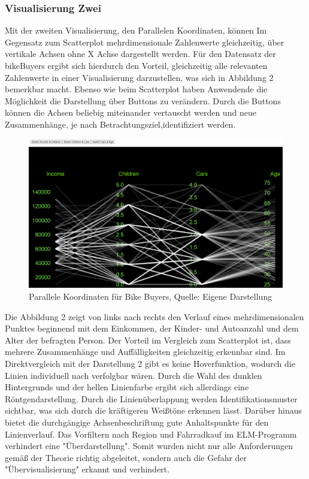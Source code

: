 \documentclass[usegeometry=true]{scrartcl}
\begin{document}
\subsubsection{Visualisierung Zwei}
Mit der zweiten Visualisierung, den Parallelen Koordinaten, können Im Gegensatz zum Scatterplot mehrdimensionale Zahlenwerte gleichzeitig, über vertikale Achsen ohne X Achse dargestellt werden.
Für den Datensatz der bikeBuyers ergibt sich hierdurch den Vorteil, gleichzeitig alle relevanten Zahlenwerte in einer Visualisierung darzustellen, was sich in Abbildung 2 bemerkbar macht. Ebenso wie beim Scatterplot haben Anwendende die Möglichkeit die Darstellung über Buttons zu verändern. Durch die Buttons können die Achsen beliebig miteinander vertauscht werden und neue Zusammenhänge, je nach Betrachtungsziel,identifiziert werden. 
\begin{figure}[h]
\begin{center}
\includegraphics[width=16cm]{Bilder/ParallelCoordsV2.png}
\caption{Parallele Koordinaten für Bike Buyers, Quelle: Eigene Darstellung}
\end{center}
\end{figure}
\newline
Die Abbildung 2 zeigt von links nach rechts den Verlauf eines mehrdimensionalen Punktes beginnend mit dem Einkommen, der Kinder- und Autoanzahl und dem Alter der befragten Person. Der Vorteil im Vergleich zum Scatterplot ist, dass mehrere Zusammenhänge und Auffälligkeiten gleichzeitig erkennbar sind. Im Direktvergleich mit der Darstellung 2 gibt es keine Hoverfunktion, wodurch die Linien individuell nach verfolgbar wären. Durch die Wahl des dunklen Hintergrunds und der hellen Linienfarbe ergibt sich allerdings eine Röntgendarstellung. Durch die Linienüberlappung werden Identifikationsmuster sichtbar, was sich durch die kräftigeren Weißtöne erkennen lässt. Darüber hinaus bietet die durchgängige Achsenbeschriftung gute Anhaltspunkte für den Linienverlauf. Das Vorfiltern nach Region und Fahrradkauf im ELM-Programm verhindert eine "Überdarstellung".  Somit wurden nicht nur alle Anforderungen gemäß der Theorie richtig abgeleitet, sondern auch die Gefahr der "Übervisualisierung" erkannt und verhindert.
\end{document}
